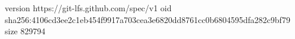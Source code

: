version https://git-lfs.github.com/spec/v1
oid sha256:4106cd3ee2c1eb454f9917a703cea3e6820dd8761cc0b6804595dfa282c9bf79
size 829794
